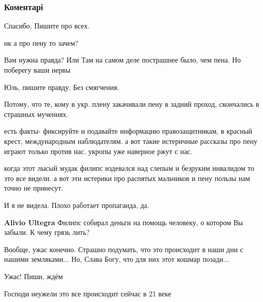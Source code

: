  
 
 
 
 
\subsubsection{Коментарі}
\label{sec:29_12_2017.fb.andrienko_julia.doneck.1.plennyje.cmt}

\begin{itemize} %
Спасибо.
Пишите про всех.

нк а про пену то зачем?

\begin{itemize} %
Вам нужна правда? Или
Там на самом деле пострашнее было, чем пена. Но поберегу ваши нервы

Юль, пишите правду. Без смягчения.

Потому, что те, кому в укр. плену закачивали пену в задний проход, скончались в страшных мучениях.

есть факты- фиксируйте и подавайте информацию правозащитникам, в красный крест, международным наблюдателям. а вот такие истеричные рассказы про пену играют только против нас. укропы уже наверное ржут с нас.

когда этот лысый мудак филипс издевался над слепым и безруким инвалидом то это все видели. а вот эти истерики про распятых мальчиков и пену пользы нам точно не принесут.

И я не видела. Плохо работает пропаганда, да.

\textbf{Alivio Ultegra} Филипс собирал деньги на помощь человеку, о котором Вы забыли. К чему грязь лить?
\end{itemize} %

Вообще, ужас конечно. Страшно подумать, что это происходит в наши дни с нашими земляками... Но, Слава Богу, что для них этот кошмар позади...

Ужас! Пиши, ждём

Господи неужели это все происходит сейчас в 21 веке


\end{itemize}
